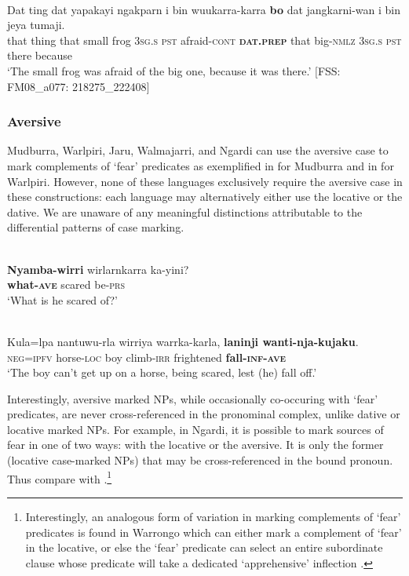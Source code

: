 \documentclass[output=paper,colorlinks,citecolor=brown]{langscibook}
\begin{document}
\ea 
{} \\
\gll Dat ting dat yapakayi ngakparn i bin wuukarra-karra \textbf{bo} dat jangkarni-wan i bin jeya tumaji. \\
that thing that small frog \textsc{3sg.s} \textsc{pst} afraid-\textsc{cont} \textbf{\textsc{dat.prep}} that big-\textsc{nmlz} \textsc{3sg.s} \textsc{pst} there because \\
\glt `The small frog was afraid of the big one, because it was there.' $[$FSS: FM08\_a077: 218275\_222408$]$
\label{ex:bro39}
\z



\subsubsection{Aversive}
\label{subsubsec:aversive}

Mudburra, Warlpiri, Jaru, Walmajarri, and Ngardi can use the aversive case to mark complements of `fear' predicates as exemplified in  for Mudburra and in  for Warlpiri. However, none of these languages exclusively require the aversive case in these constructions: each language may alternatively either use the locative or the dative. We are unaware of any meaningful distinctions attributable to the differential patterns of case marking.

\ea 
{} \\
\gll \textbf{Nyamba-wirri} wirlarnkarra ka-yini? \\
\textbf{what-\textsc{ave}} scared be-\textsc{prs} \\
\glt `What is he scared of?' 
\label{ex:bro40}
\z

\ea 
{} \\
\gll Kula=lpa nantuwu-rla wirriya warrka-karla, \textbf{laninji wanti-nja-kujaku}. \\
\textsc{neg=ipfv} horse-\textsc{loc} boy climb-\textsc{irr} frightened \textbf{fall-\textsc{inf-ave}} \\
\glt `The boy can't get up on a horse, being scared, lest (he) fall off.'
\label{ex:bro41}
\z

 Interestingly, aversive marked NPs, while occasionally co-occuring with `fear' predicates, are never cross-referenced in the pronominal complex, unlike dative or locative marked NPs. For example, in Ngardi, it is possible to mark sources of fear in one of two ways: with the locative or the aversive. It is only the former (locative case-marked NPs) that may be cross-referenced in the bound pronoun. Thus compare  with .\footnote{Interestingly, an analogous form of variation in marking complements of `fear' predicates is found in Warrongo which can either mark a complement of `fear' in the locative, or else the `fear' predicate can select an entire subordinate clause whose predicate will take a dedicated `apprehensive' inflection \citep[619]{tsunoda_grammar_2011}.}
\end{document}
